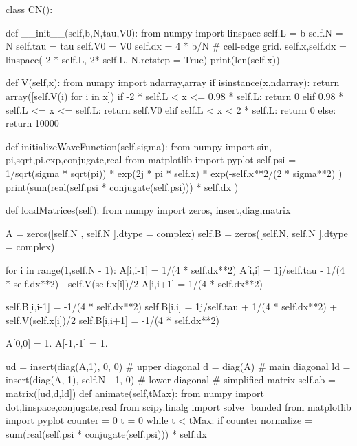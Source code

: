 \begin{codeexample}
\begin{VerbatimOut}{\listingFile}


class CN():

    def __init__(self,b,N,tau,V0):
        from numpy import linspace
        self.L = b
        self.N = N
        self.tau = tau
        self.V0 = V0
        self.dx = 4 * b/N
        # cell-edge grid.
        self.x,self.dx = linspace(-2 * self.L, 2* self.L, N,retstep = True)
        print(len(self.x))

    def V(self,x):
        from numpy import ndarray,array
        if isinstance(x,ndarray):
            return array([self.V(i) for i in x])
        if -2 * self.L < x <= 0.98 * self.L:
            return 0
        elif 0.98 * self.L <= x <= self.L:
            return self.V0
        elif self.L < x < 2 * self.L:
            return 0
        else:
            return 10000
        
    def initializeWaveFunction(self,sigma):
        from numpy import sin, pi,sqrt,pi,exp,conjugate,real
        from matplotlib import pyplot
        self.psi = 1/sqrt(sigma * sqrt(pi)) * exp(2j * pi * self.x) * exp(-self.x**2/(2 * sigma**2) )
        print(sum(real(self.psi * conjugate(self.psi))) * self.dx )
        
    def loadMatrices(self):
        from numpy import zeros, insert,diag,matrix

        A = zeros([self.N , self.N ],dtype = complex)
        self.B = zeros([self.N, self.N ],dtype = complex)

        for i in range(1,self.N - 1):
            A[i,i-1] = 1/(4 * self.dx**2)
            A[i,i] = 1j/self.tau - 1/(4 * self.dx**2) - self.V(self.x[i])/2
            A[i,i+1] = 1/(4 * self.dx**2)

            self.B[i,i-1] = -1/(4 * self.dx**2)
            self.B[i,i] = 1j/self.tau + 1/(4 * self.dx**2) + self.V(self.x[i])/2
            self.B[i,i+1] = -1/(4 * self.dx**2)

        A[0,0] = 1.
        A[-1,-1] = 1.


        ud = insert(diag(A,1), 0, 0) # upper diagonal
        d = diag(A) # main diagonal
        ld = insert(diag(A,-1), self.N - 1, 0) # lower diagonal
        # simplified matrix
        self.ab = matrix([ud,d,ld])
    def animate(self,tMax):
        from numpy import dot,linspace,conjugate,real
        from scipy.linalg import solve_banded
        from matplotlib import pyplot
        counter = 0
        t = 0
        while t < tMax:
            if counter %
                normalize = sum(real(self.psi * conjugate(self.psi))) * self.dx
                

\end{VerbatimOut}
\end{codeexample}

